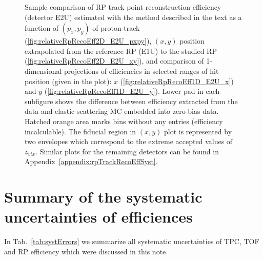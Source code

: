 \begin{figure}[h]
{\begin{subfigure}[b]{\linewidth}
		\end{subfigure}
	}
	\caption[Coparison of estimated RP track point reconstruction efficiency in 2D and 1D (detector E2U).]%
	{Sample comparison of RP track point reconstruction efficiency (detector E2U) estimated with the method described in the text as a function of $(p_{x},p_{y})$ of proton track (\ref{fig:relativeRpRecoEff2D_E2U_pxpy}), $(x,y)$ position extrapolated from the reference RP (E1U) to the studied RP (\ref{fig:relativeRpRecoEff2D_E2U_xy}), and comparison of 1-dimensional projections of efficiencies in selected ranges of hit position (given in the plot): $x$ (\ref{fig:relativeRpRecoEff1D_E2U_x}) and $y$ (\ref{fig:relativeRpRecoEff1D_E2U_y}). Lower pad in each subfigure shows the difference between efficiency extracted from the data and elastic scattering MC embedded into zero-bias data. Hatched orange area marks bins without any entries (efficiency incalculable). The fiducial region in $(x,y)$ plot is represented by two envelopes which correspond to the extreme accepted values of $z_{vtx}$. Similar plots for the remaining detectors can be found in Appendix~\ref{appendix:rpTrackRecoEffSyst}.%
	}\label{fig:relativeRpRecoEff_E2U}
\end{figure}



\section{Summary of the systematic uncertainties of efficiences}

In Tab.~\ref{tab:systErrors} we summarize all systematic uncertainties of TPC, TOF and RP efficiency which were discussed in this note.

